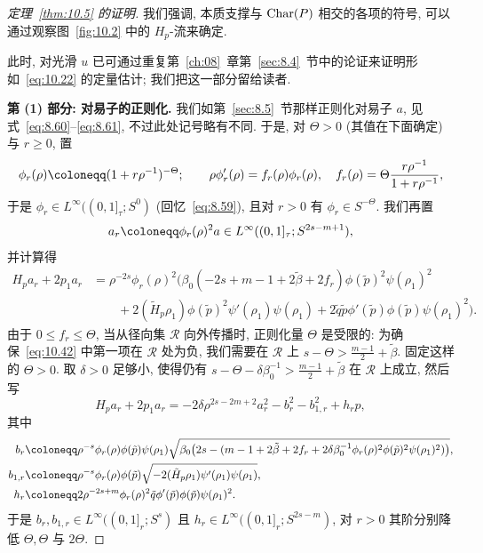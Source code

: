 \begin{proof}[定理~\ref{thm:10.5} 的证明]
我们强调, 本质支撑与 $\operatorname{Char}(P)$ 相交的各项的符号, 可以通过观察图~\ref{fig:10.2} 中的 $H_p$-流来确定.

此时, 对光滑 $u$ 已可通过重复第~\ref{ch:08}~章第~\ref{sec:8.4}~节中的论证来证明形如~\eqref{eq:10.22} 的定量估计; 我们把这一部分留给读者.

\medskip\noindent\textbf{第 (1) 部分: 对易子的正则化.} 我们如第~\ref{sec:8.5}~节那样正则化对易子 $a$, 见式~\eqref{eq:8.60}--\eqref{eq:8.61}, 不过此处记号略有不同. 于是, 对 $\Theta > 0$ (其值在下面确定) 与 $r \ge 0$, 置
\begin{equation}\label{eq:10.40}
    \phi_r(\rho) \defeq (1 + r\rho^{-1})^{-\Theta}; \qquad
    \rho\phi_r'(\rho) = f_r(\rho)\phi_r(\rho), \quad f_r(\rho) = \Theta\frac{r\rho^{-1}}{1 + r\rho^{-1}},
\end{equation}
于是 $\phi_r \in L^\infty((0,1]_\tau; S^0)$ (回忆~\eqref{eq:8.59}), 且对 $r > 0$ 有 $\phi_r \in S^{-\Theta}$. 我们再置
\begin{equation}\label{eq:10.41}
    a_r \defeq \phi_r(\rho)^2 a \in L^\infty((0,1]_\tau; S^{2s-m+1}),
\end{equation}
并计算得
\begin{equation}\label{eq:10.42}
    \begin{aligned}
        H_p a_r + 2p_1 a_r &= \rho^{-2s}\phi_r(\rho)^2 \Big( \beta_0(-2s + m - 1 + 2\tilde{\beta} + 2f_r)\phi(\tilde{p})^2 \psi(\rho_1)^2 \\
        &\qquad + 2(\tilde{H}_p \rho_1)\phi(\tilde{p})^2 \psi'(\rho_1)\psi(\rho_1)
        + 2\tilde{q}\tilde{p}\phi'(\tilde{p})\phi(\tilde{p})\psi(\rho_1)^2 \Big).
    \end{aligned}
\end{equation}
由于 $0 \le f_r \le \Theta$, 当从径向集 $\mathcal{R}$ 向外传播时, 正则化量 $\Theta$ 是受限的: 为确保~\eqref{eq:10.42} 中第一项在 $\mathcal{R}$ 处为负, 我们需要在 $\mathcal{R}$ 上 $s - \Theta > \frac{m-1}{2} + \tilde{\beta}$. 固定这样的 $\Theta > 0$. 取 $\delta > 0$ 足够小, 使得仍有 $s - \Theta - \delta\beta_0^{-1} > \frac{m-1}{2} + \tilde{\beta}$ 在 $\mathcal{R}$ 上成立, 然后写
\begin{equation}\label{eq:10.43}
    H_p a_r + 2p_1 a_r = -2\delta\rho^{2s-2m+2} a_r^2 - b_r^2 - b_{1,r}^2 + h_r p,
\end{equation}
其中
\begin{equation}\label{eq:10.44}
    \begin{aligned}
        b_r &\defeq \rho^{-s}\phi_r(\rho)\phi(\tilde{p})\psi(\rho_1)
        \sqrt{\beta_0\bigl(2s - (m - 1 + 2\tilde{\beta} + 2f_r + 2\delta\beta_0^{-1}\phi_r(\rho)^2\phi(\tilde{p})^2\psi(\rho_1)^2)\bigr)}, \\
        b_{1,r} &\defeq \rho^{-s}\phi_r(\rho)\phi(\tilde{p})\sqrt{-2(\tilde{H}_p\rho_1)\psi'(\rho_1)\psi(\rho_1)}, \\
        h_r &\defeq 2\rho^{-2s+m}\phi_r(\rho)^2 \tilde{q}\phi'(\tilde{p})\phi(\tilde{p})\psi(\rho_1)^2.
    \end{aligned}
\end{equation}
于是 $b_r, b_{1,r} \in L^\infty((0,1]_r; S^s)$ 且 $h_r \in L^\infty((0,1]_r; S^{2s-m})$, 对 $r > 0$ 其阶分别降低 $\Theta, \Theta$ 与 $2\Theta$.


\end{proof}
